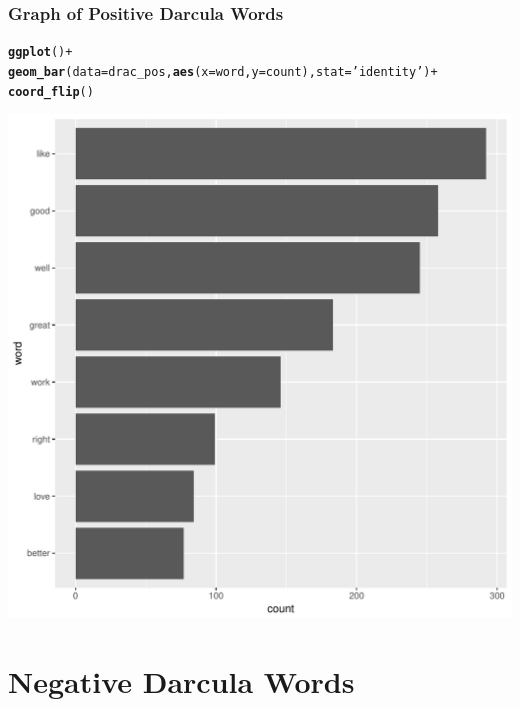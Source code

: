 \documentclass{beamer}\usepackage[]{graphicx}\usepackage[]{color}
\makeatletter
\def\maxwidth{ %
  \ifdim\Gin@nat@width>\linewidth
    \linewidth
  \else
    \Gin@nat@width
  \fi
}
\newcommand{\hlstr}[1]{\textcolor[rgb]{0.192,0.494,0.8}{#1}}%
\newcommand{\hlopt}[1]{\textcolor[rgb]{0,0,0}{#1}}%
\newcommand{\hlstd}[1]{\textcolor[rgb]{0.345,0.345,0.345}{#1}}%
\newcommand{\hlkwc}[1]{\textcolor[rgb]{0.333,0.667,0.333}{#1}}%
\newcommand{\hlkwd}[1]{\textcolor[rgb]{0.737,0.353,0.396}{\textbf{#1}}}%
\newenvironment{kframe}{%
 \def\at@end@of@kframe{}%
 \ifinner\ifhmode%
  \def\at@end@of@kframe{\end{minipage}}%
  \begin{minipage}{\columnwidth}%
 \fi\fi%
 \def\FrameCommand##1{\hskip\@totalleftmargin \hskip-\fboxsep
 \colorbox{shadecolor}{##1}\hskip-\fboxsep
     \hskip-\linewidth \hskip-\@totalleftmargin \hskip\columnwidth}%
 \MakeFramed {\advance\hsize-\width
   \@totalleftmargin\z@ \linewidth\hsize
   \@setminipage}}%
 {\par\unskip\endMakeFramed%
 \at@end@of@kframe}
\newenvironment{knitrout}{}{} %
\makeatother
\begin{document}
\begin{frame}[fragile]

  \frametitle{Graph of Positive Darcula Words}
\begin{knitrout}
\color{fgcolor}\begin{kframe}
\begin{alltt}
\hlkwd{ggplot}\hlstd{()}\hlopt{+}
  \hlkwd{geom_bar}\hlstd{(}\hlkwc{data} \hlstd{= drac_pos,}\hlkwd{aes}\hlstd{(}\hlkwc{x}\hlstd{=word,}\hlkwc{y}\hlstd{=count),}\hlkwc{stat}\hlstd{=}\hlstr{'identity'}\hlstd{)}\hlopt{+}
  \hlkwd{coord_flip}\hlstd{()}
\end{alltt}
\end{kframe}
\includegraphics[width=\maxwidth]{figure/unnamed-chunk-12-1} 

\end{knitrout}
  
\end{frame}

\section{Negative Darcula Words}
\end{document}
